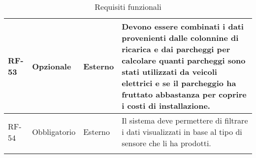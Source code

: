 \begin{longtable}{|>{\centering\arraybackslash}m{}|>{\centering\arraybackslash}m{}|>{\centering\arraybackslash}m{}|>{\centering\arraybackslash}m{}|}
	\\\hline
	RF-53           & Opzionale           & Esterno                                                                                                           & Devono essere combinati i dati provenienti dalle colonnine di ricarica e dai parcheggi per calcolare quanti parcheggi sono stati utilizzati da veicoli elettrici e se il parcheggio ha fruttato abbastanza per coprire i costi di installazione.
	\\\hline
	RF-54           & Obbligatorio        & Esterno                                                                                                           & Il sistema deve permettere di filtrare i dati visualizzati in base al tipo di sensore che li ha prodotti.
	\\\hline
	\caption{Requisiti funzionali}
\end{longtable}

\newpage


